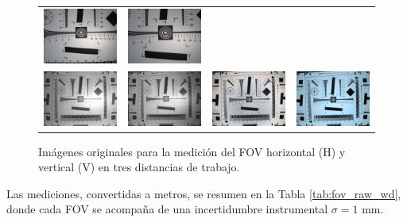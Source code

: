 \begin{figure}[H]
\begin{tabular}{cccc}
         \includegraphics[width=.22\linewidth]{Figures/C4/FOV/VIS/H/37_8.png} &
         \includegraphics[width=.22\linewidth]{Figures/C4/FOV/VIS/V/30_3.png} \\
         \includegraphics[width=.22\linewidth]{Figures/C4/FOV/NIR/H/63.png} &
         \includegraphics[width=.22\linewidth]{Figures/C4/FOV/NIR/V/65.png} &
         \includegraphics[width=.22\linewidth]{Figures/C4/FOV/VIS/H/69_4.png} &
         \includegraphics[width=.22\linewidth]{Figures/C4/FOV/VIS/V/70.png} \\
       \end{tabular}
       \caption{Imágenes originales para la medición del FOV horizontal (H)
                y vertical (V) en tres distancias de trabajo.}
       \label{fig:fov_montage}
     \end{figure}
     
     Las mediciones, convertidas a metros, se resumen en la Tabla \ref{tab:fov_raw_wd}, donde cada FOV se acompaña de una incertidumbre instrumental \(\sigma=1\) mm.
     
